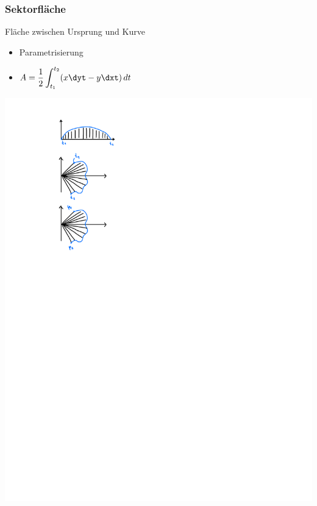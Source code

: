     \subsubsection{Sektorfläche}
        \flushleft Fläche zwischen Ursprung und Kurve
        \begin{minipage}{0.99\linewidth}
            \begin{minipage}{0.65\linewidth}
                \begin{itemize}
                    \item Parametrisierung
                    \item[]  $\displaystyle A= \frac{1}{2} \int_{t_1}^{t_2} (x \dyt - y \dxt) \, dt$   
                    \end{itemize}
            \end{minipage}
            \begin{minipage}{0.34\linewidth}
                    \includegraphics[width=0.6\linewidth]{src/Integralrechnung/sektor.pdf}
            \end{minipage}
        \end{minipage}
        
